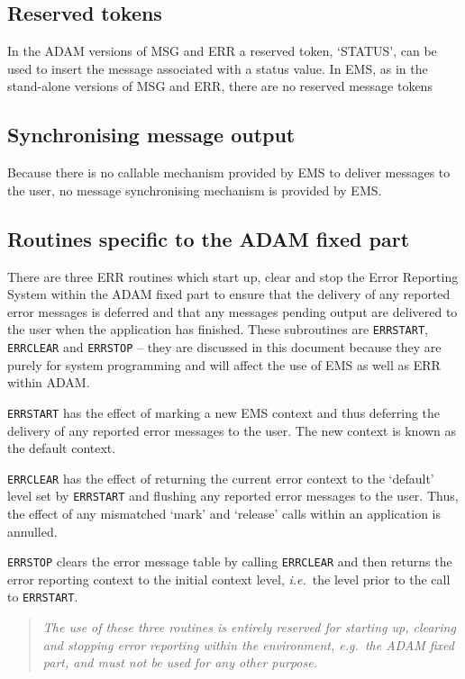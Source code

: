 \documentclass[twoside,11pt]{article}
\newcommand{\xlabel}[1]{}
\renewcommand{\_}{\texttt{\symbol{95}}}
\begin{document}
\subsection{\xlabel{reserved_tokens}Reserved tokens}
In the ADAM versions of MSG and ERR a reserved token, `STATUS', can be
used to insert the message associated with a status value.
In EMS, as in the stand-alone versions of MSG and ERR, there are no reserved
message tokens

\subsection{\xlabel{synchronising_message_output}Synchronising message output}
Because there is no callable mechanism provided by EMS to deliver messages to
the user, no message synchronising mechanism is provided by EMS.

\subsection{\xlabel{routines_specific_to_the_adam_fixed_part}Routines specific
to the ADAM fixed part}
There are three ERR routines which start up, clear and stop the Error Reporting
System within the ADAM fixed part to ensure that the delivery of any 
reported error messages is deferred and that any messages pending output are 
delivered to the user when the application has finished.
These subroutines are \texttt{ERR\_START}, \texttt{ERR\_CLEAR} and
\texttt{ERR\_STOP} -- they are
discussed in this document because they are purely for system programming and
will affect the use of EMS as well as ERR within ADAM.

\texttt{ERR\_START} has the effect of marking a new EMS context and thus
deferring the delivery of any reported error messages to the user.
The new context is known as the default context.

\texttt{ERR\_CLEAR} has the effect of returning the current error context to
the `default' level set by \texttt{ERR\_START} and flushing any reported error
messages to the user.
Thus, the effect of any mismatched `mark' and `release' calls within an
application is annulled.

\texttt{ERR\_STOP} clears the error message table by calling
\texttt{ERR\_CLEAR} and then returns
the error reporting context to the initial context level, \textit{i.e.}\ the
level prior to the call to \texttt{ERR\_START}.

\begin {quote}
\emph{The use of these three routines is entirely reserved for starting up, 
clearing and 
stopping error reporting within the environment, \textit{e.g.}\ the ADAM fixed 
part, and must not be used for any other purpose.}
\end {quote}
\end{document}
